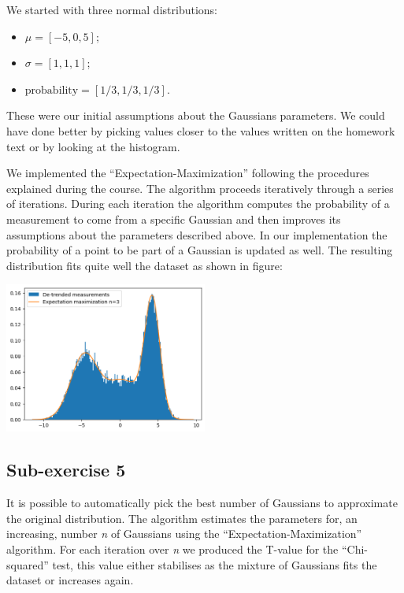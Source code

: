 \documentclass[10pt,a4paper]{article}
\begin{document}
We started with three normal distributions:
\begin{itemize}
\item \(\mu = [-5, 0, 5]\);
\item \(\sigma = [1, 1, 1]\);
\item \(\text{probability} = [1/3, 1/3, 1/3]\).
\end{itemize}

These were our initial assumptions about the Gaussians parameters. We could have done better by picking values closer to the values written on the homework text or by looking at the histogram.

We implemented the ``Expectation-Maximization'' following the procedures explained during the course. The algorithm proceeds iteratively through a series of iterations. During each iteration the algorithm computes the probability of a measurement to come from a specific Gaussian and then improves its assumptions about the parameters described above. In our implementation the probability of a point to be part of a Gaussian is updated as well. The resulting distribution fits quite well the dataset as shown in figure:

\begin{center}
  \includegraphics[width=0.5\textwidth]{point4.png}
\end{center}

\subsection*{Sub-exercise 5}

It is possible to automatically pick the best number of Gaussians to approximate the original distribution. The algorithm estimates the parameters for, an increasing, number \emph{n} of Gaussians using the ``Expectation-Maximization'' algorithm. For each iteration over \emph{n} we produced the T-value for the ``Chi-squared'' test, this value either stabilises as the mixture of Gaussians fits the dataset or increases again.%
\end{document}
